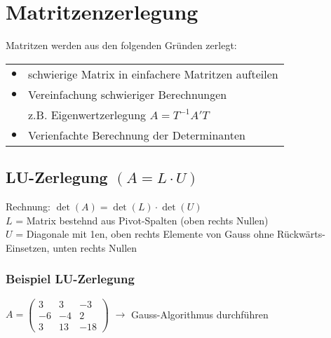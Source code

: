     
		 \section{Matritzenzerlegung}
		 Matritzen werden aus den folgenden Gründen zerlegt: \\
		 \begin{tabular}{ll}
		 $\bullet$ &  schwierige Matrix in einfachere Matritzen aufteilen \\
		 $\bullet$ & Vereinfachung schwieriger Berechnungen \\
		 & z.B. Eigenwertzerlegung $A = T^{-1} A' T$ \\
		 $\bullet$ & Verienfachte Berechnung der Determinanten 
		 \end{tabular}
		 
		 
		 
		 
		 
		    \subsection{LU-Zerlegung $(A = L \cdot U)$}
			Rechnung: \quad  $\det(A) =  \det(L) \cdot \det(U)$ \\ 
			$L$ = Matrix bestehnd aus Pivot-Spalten (oben rechts Nullen) \\
			$U$ = Diagonale mit 1en, oben rechts Elemente von Gauss ohne Rückwärts-Einsetzen, unten rechts Nullen \\	
			
			\subsubsection{Beispiel LU-Zerlegung}
			
			$A = \begin{pmatrix}	3 & 3 & -3 \\ -6 & -4 & 2 \\ 3 & 13 & -18 \end{pmatrix}$ \qquad $\rightarrow$ Gauss-Algorithmus durchführen \\
			\vspace{0.3cm}
			
